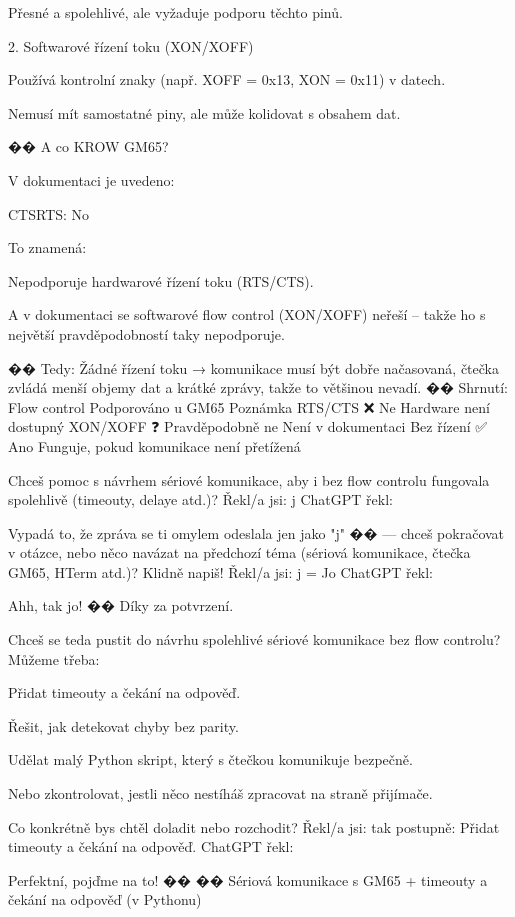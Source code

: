     Přesné a spolehlivé, ale vyžaduje podporu těchto pinů.

2. Softwarové řízení toku (XON/XOFF)

    Používá kontrolní znaky (např. XOFF = 0x13, XON = 0x11) v datech.

    Nemusí mít samostatné piny, ale může kolidovat s obsahem dat.

�� A co KROW GM65?

V dokumentaci je uvedeno:

    CTSRTS: No

To znamená:

    Nepodporuje hardwarové řízení toku (RTS/CTS).

    A v dokumentaci se softwarové flow control (XON/XOFF) neřeší – takže ho s největší pravděpodobností taky nepodporuje.

�� Tedy: Žádné řízení toku → komunikace musí být dobře načasovaná, čtečka zvládá menší objemy dat a krátké zprávy, takže to většinou nevadí.
�� Shrnutí:
Flow control	Podporováno u GM65	Poznámka
RTS/CTS	❌ Ne	Hardware není dostupný
XON/XOFF	❓ Pravděpodobně ne	Není v dokumentaci
Bez řízení	✅ Ano	Funguje, pokud komunikace není přetížená

Chceš pomoc s návrhem sériové komunikace, aby i bez flow controlu fungovala spolehlivě (timeouty, delaye atd.)?
Řekl/a jsi:
j
ChatGPT řekl:

Vypadá to, že zpráva se ti omylem odeslala jen jako "j" �� — chceš pokračovat v otázce, nebo něco navázat na předchozí téma (sériová komunikace, čtečka GM65, HTerm atd.)? Klidně napiš!
Řekl/a jsi:
j = Jo
ChatGPT řekl:

Ahh, tak jo! �� Díky za potvrzení.

Chceš se teda pustit do návrhu spolehlivé sériové komunikace bez flow controlu? Můžeme třeba:

    Přidat timeouty a čekání na odpověď.

    Řešit, jak detekovat chyby bez parity.

    Udělat malý Python skript, který s čtečkou komunikuje bezpečně.

    Nebo zkontrolovat, jestli něco nestíháš zpracovat na straně přijímače.

Co konkrétně bys chtěl doladit nebo rozchodit?
Řekl/a jsi:
tak postupně: Přidat timeouty a čekání na odpověď.
ChatGPT řekl:

Perfektní, pojďme na to! ��
�� Sériová komunikace s GM65 + timeouty a čekání na odpověď (v Pythonu)

